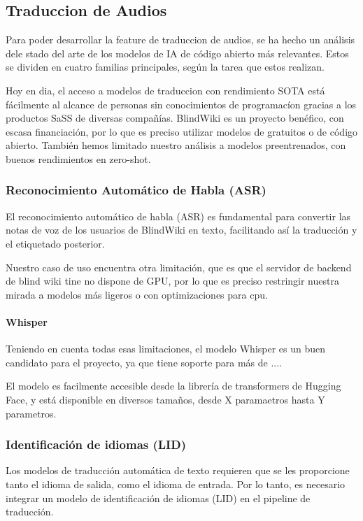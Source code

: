 \subsection{Traduccion de Audios}
Para poder desarrollar la feature de traduccion de audios, se ha hecho un análisis dele stado del arte de los modelos de IA de código abierto más relevantes. Estos se dividen en cuatro familias principales, según la tarea que estos realizan.

Hoy en dia, el acceso a modelos de traduccion con rendimiento SOTA está fácilmente al alcance de personas sin conocimientos de programacíon gracias a los productos SaSS de diversas compañías. BlindWiki es un proyecto benéfico, con escasa financiación, por lo que es preciso utilizar modelos de gratuitos o de código abierto. También hemos limitado nuestro análisis a modelos preentrenados, con buenos rendimientos en zero-shot.

\subsubsection{Reconocimiento Automático de Habla (ASR)}

El reconocimiento automático de habla (ASR) es fundamental para convertir las notas de voz de los usuarios de BlindWiki en texto, facilitando así la traducción y el etiquetado posterior.


Nuestro caso de uso encuentra otra limitación, que es que el servidor de backend de blind wiki tine no dispone de GPU, por lo que es preciso restringir nuestra mirada a modelos más ligeros o con optimizaciones para cpu.

\paragraph{Whisper}
Teniendo en cuenta todas esas limitaciones, el modelo Whisper es un buen candidato para el proyecto, ya que tiene soporte para más de ....

El modelo es facilmente accesible desde la librería de transformers de Hugging Face, y está disponible en diversos tamaños, desde X paramaetros hasta Y parametros.

\subsubsection{Identificación de idiomas (LID)}
Los modelos de traducción automática de texto requieren que se les proporcione tanto el idioma de salida, como el idioma de entrada. Por lo tanto, es necesario integrar un modelo de identificación de idiomas (LID) en el pipeline de traducción.



